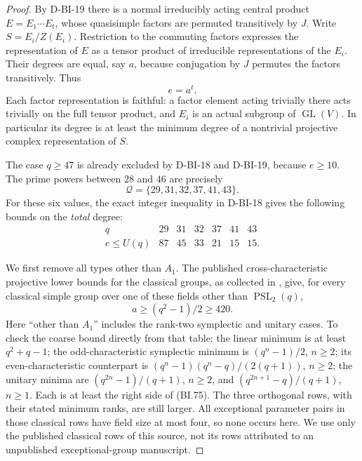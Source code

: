 \begin{proof}
By D-BI-19 there is a normal irreducibly acting central product
$E=E_1\cdots E_t$, whose quasisimple factors are permuted
transitively by $J$.  Write $S=E_i/Z(E_i)$.  Restriction to the
commuting factors expresses the representation of $E$ as a tensor
product of irreducible representations of the $E_i$.  Their degrees
are equal, say $a$, because conjugation by $J$ permutes the factors
transitively.  Thus
\[
                              e=a^t.                        \tag{BI.73}
\]
Each factor representation is faithful: a factor element acting
trivially there acts trivially on the full tensor product, and $E_i$
is an actual subgroup of $\operatorname{GL}(V)$.  In particular its
degree is at least the minimum degree of a nontrivial projective
complex representation of $S$.

The case $q\ge47$ is already excluded by D-BI-18 and D-BI-19,
because $e\ge10$.  The prime powers between $28$ and $46$ are
precisely
\[
                    \mathcal Q=\{29,31,32,37,41,43\}.
\]
For these six values, the exact integer inequality in D-BI-18 gives
the following bounds on the \emph{total} degree:
\[
\begin{array}{c|rrrrrr}
q&29&31&32&37&41&43\\ \hline
e\le U(q)&87&45&33&21&15&15.
\end{array}                                                   \tag{BI.74}
\]

We first remove all types other than $A_1$.  The published
cross-characteristic projective lower bounds for the classical
groups, as collected in \cite[Table~1, author version p.~14]{BI:Hoffman},
give, for every classical simple group over one of these fields
other than $\operatorname{PSL}_2(q)$,
\[
                        a\ge(q^2-1)/2\ge420.                \tag{BI.75}
\]
Here ``other than $A_1$'' includes the rank-two symplectic and
unitary cases.  To check the coarse bound directly from that table:
the linear minimum is at least $q^2+q-1$; the odd-characteristic
symplectic minimum is $(q^n-1)/2$, $n\ge2$; its
even-characteristic counterpart is
$(q^n-1)(q^n-q)/(2(q+1))$, $n\ge2$; the unitary minima are
$(q^{2n}-1)/(q+1)$, $n\ge2$, and
$(q^{2n+1}-q)/(q+1)$, $n\ge1$.  Each is at least the right
side of (BI.75).  The three orthogonal rows, with their stated
minimum ranks, are still larger.  All exceptional parameter pairs
in those classical rows have field size at most four, so none
occurs here.  We use only the published classical rows of this
source, not its rows attributed to an unpublished exceptional-group
manuscript.


\end{proof}
